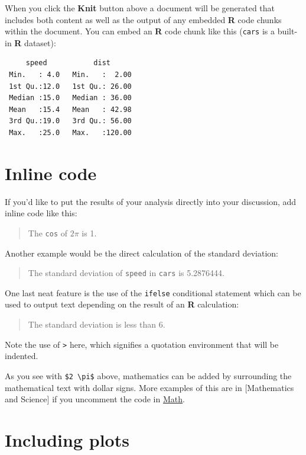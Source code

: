 \documentclass[12pt,twoside]{dukestatscithesis}
\theoremstyle{definition}
\theoremstyle{definition}
\theoremstyle{definition}
\theoremstyle{remark}
\begin{document}
When you click the \textbf{Knit} button above a document will be
generated that includes both content as well as the output of any
embedded \textbf{R} code chunks within the document. You can embed an
\textbf{R} code chunk like this (\texttt{cars} is a built-in \textbf{R}
dataset):
\begin{Shaded}
\begin{Highlighting}[]
\end{Highlighting}
\end{Shaded}
\begin{verbatim}
     speed           dist       
 Min.   : 4.0   Min.   :  2.00  
 1st Qu.:12.0   1st Qu.: 26.00  
 Median :15.0   Median : 36.00  
 Mean   :15.4   Mean   : 42.98  
 3rd Qu.:19.0   3rd Qu.: 56.00  
 Max.   :25.0   Max.   :120.00  
\end{verbatim}
\section{Inline code}\label{inline-code}

If you'd like to put the results of your analysis directly into your
discussion, add inline code like this:
\begin{quote}
The \texttt{cos} of \(2 \pi\) is 1.
\end{quote}
Another example would be the direct calculation of the standard
deviation:
\begin{quote}
The standard deviation of \texttt{speed} in \texttt{cars} is 5.2876444.
\end{quote}
One last neat feature is the use of the \texttt{ifelse} conditional
statement which can be used to output text depending on the result of an
\textbf{R} calculation:
\begin{quote}
The standard deviation is less than 6.
\end{quote}
Note the use of \texttt{\textgreater{}} here, which signifies a
quotation environment that will be indented.

As you see with \texttt{\$2\ \textbackslash{}pi\$} above, mathematics
can be added by surrounding the mathematical text with dollar signs.
More examples of this are in {[}Mathematics and Science{]} if you
uncomment the code in \protect\hyperlink{math}{Math}.

\section{Including plots}\label{including-plots}
\end{document}
